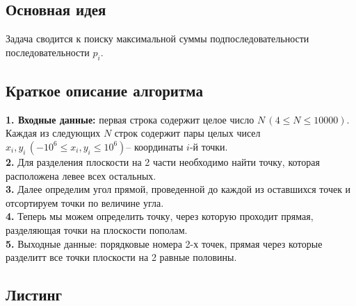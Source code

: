 \documentclass[a5paper, 10pt]{article}
\theoremstyle{definition}
\theoremstyle{plain}
\theoremstyle{remark}
\begin{document}
\subsection{Основная идея}
Задача сводится к поиску максимальной суммы подпоследовательности последовательности $p_i$.

\subsection{Краткое описание алгоритма}
\textbf{1. Входные данные:} первая строка содержит целое число $N\, (4 \leq N \leq 10000)$. Каждая из следующих $N$ строк содержит пары целых чисел $x_i, y_i \, (-10^6 \leq x_i, y_i \leq 10^6)$-- координаты $i$-й точки. \\
\textbf{2.} Для разделения плоскости на 2 части необходимо найти точку, которая расположена левее всех остальных. \\
\textbf{3.} Далее определим угол прямой, проведенной до каждой из оставшихся точек и отсортируем точки по величине угла. \\
\textbf{4.} Теперь мы можем определить точку, через которую проходит прямая, разделяющая точки на плоскости пополам. \\
\textbf{5.} Выходные данные: порядковые номера 2-х точек, прямая через которые разделитт все точки плоскости на 2 равные половины.

\subsection{Листинг}
\end{document}

